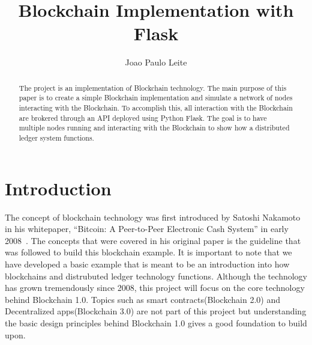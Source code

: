 
\title{Blockchain Implementation with Flask}


\author{Joao Paulo Leite}

\renewcommand{\shortauthors}{J. P. Leite}


\begin{abstract}
The project is an implementation of Blockchain technology. The main purpose of 
this paper is to create a simple Blockchain implementation and simulate a 
network of nodes interacting with the Blockchain. To accomplish this, all 
interaction with the Blockchain are brokered through an API deployed using 
Python Flask. The goal is to have multiple nodes running and interacting with 
the Blockchain to show how a distributed ledger system functions.

\end{abstract}



\maketitle

\section{Introduction}

The concept of blockchain technology was first introduced by Satoshi Nakamoto in
his whitepaper, “Bitcoin: A Peer-to-Peer Electronic Cash System” in early 2008~\cite{hid-sp18-414-www-blockchain-theory-application}. 
The concepts that were covered in his original paper is the guideline that was 
followed to build this blockchain example. It is important to note that we have 
developed a basic example that is meant to be an introduction into how 
blockchains and distrubuted ledger technology functions. Although the 
technology has grown tremendously since 2008, this project will focus on the 
core technology behind Blockchain 1.0. Topics such as smart 
contracts(Blockchain 2.0) and Decentralized apps(Blockchain 3.0) are not part of 
this project but understanding the basic design principles behind Blockchain 1.0 
gives a good foundation to build upon. 

